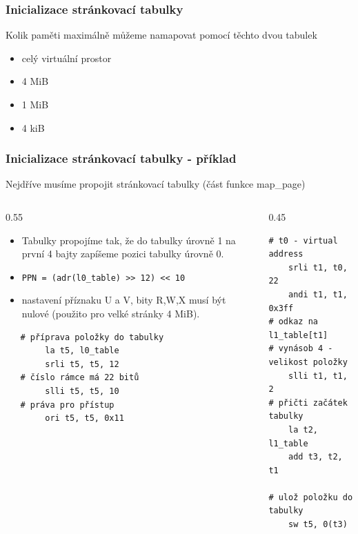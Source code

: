\documentclass[aspectratio=169]{beamer}
\begin{document}
\begin{frame}
\frametitle{Inicializace stránkovací tabulky}

Kolik paměti maximálně můžeme namapovat pomocí těchto dvou tabulek
\begin{itemize}
 \item[A] celý virtuální prostor
 \item[B] 4 MiB
 \item[C] 1 MiB
 \item[D] 4 kiB
\end{itemize}
\end{frame}




\begin{frame}[fragile]
\frametitle{Inicializace stránkovací tabulky - příklad}

Nejdříve musíme propojit stránkovací tabulky (část funkce map\_page)
\vspace{-0.4cm}
\begin{columns}[t]
\begin{column}{0.55\textwidth}
\begin{itemize}
\item Tabulky propojíme tak, že do tabulky úrovně 1 na první 4 bajty zapíšeme pozici tabulky úrovně 0.
\item \texttt{PPN = (adr(l0\_table) >> 12) << 10}
\item nastavení příznaku U a V, bity R,W,X musí být nulové (použito pro velké stránky 4 MiB).
\end{itemize}
\begin{verbatim}
   # příprava položky do tabulky
        la t5, l0_table
        srli t5, t5, 12
   # číslo rámce má 22 bitů
        slli t5, t5, 10
   # práva pro přístup
        ori t5, t5, 0x11
\end{verbatim}
\end{column}
\hfill
\begin{column}{0.45\textwidth}
\begin{verbatim}
# t0 - virtual address
    srli t1, t0, 22
    andi t1, t1, 0x3ff
# odkaz na l1_table[t1]
# vynásob 4 - velikost položky
    slli t1, t1, 2
# přičti začátek tabulky
    la t2, l1_table
    add t3, t2, t1

# ulož položku do tabulky
    sw t5, 0(t3)
\end{verbatim}
\end{column}
\end{columns}

\end{frame}
\end{document}

